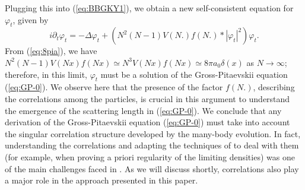 \documentclass[11pt,a4paper]{article}
\begin{document}
Plugging this into (\ref{eq:BBGKY1}), we obtain a new self-consistent equation for $\varphi_t$,  given by
\begin{equation}\label{eq:gp-mod0} i\partial_t \varphi_t = -\Delta \varphi_t
+ \left(N^2 (N-1) V(N.) f(N.) * |\varphi_t|^2 \right) \varphi_t.
\end{equation}
{F}rom (\ref{eq:8pia}), we have $N^2 (N-1) V(Nx) f(Nx) \simeq N^3 V(Nx) f(Nx) \simeq 8\pi a_0 \delta (x)$ as $N \to \infty$; therefore, in this limit, $\varphi_t$ must be a solution of the Gross-Pitaevskii equation (\ref{eq:GP-0}). We observe here that the presence of the factor $f(N.)$, describing the correlations among the particles, is crucial in this argument to understand the emergence of the scattering length in  (\ref{eq:GP-0}). We conclude that any derivation of the Gross-Pitaevskii equation (\ref{eq:GP-0}) must take into account the singular correlation structure developed by the many-body evolution. In fact, understanding the correlations and adapting the techniques of \cite{S,EY,ES} to deal with them (for example, when proving a priori regularity of the limiting densities) was one of the main challenges faced in \cite{ESY0,ESY1,ESY2,ESY3,ESY4}. As we will discuss shortly, correlations also play a major role in the approach presented in this paper. 

\bigskip
\end{document}
